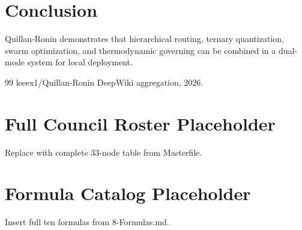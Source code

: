 \documentclass[11pt,a4paper,twocolumn]{article}
\begin{document}
\section{Conclusion}
Quillan-Ronin demonstrates that hierarchical routing, ternary quantization, swarm optimization, and thermodynamic governing can be combined in a dual-mode system for local deployment.

\begin{thebibliography}{99}
 leeex1/Quillan-Ronin DeepWiki aggregation, 2026.
\end{thebibliography}

\appendix
\section{Full Council Roster Placeholder}
Replace with complete 33-node table from Masterfile.
\section{Formula Catalog Placeholder}
Insert full ten formulas from 8-Formulas.md.
\end{document}
